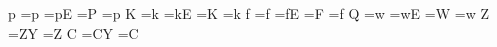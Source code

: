 {    \fi
   \fi%
  \else \if\thischar p%
   \iffollowingisboundary%
    \ifpreviousisboundary%
     \t@kenbuffer=\expandafter{\the\t@kenbuffer p}%
    \else     %
     \t@kenbuffer=\expandafter{\the\t@kenbuffer pE}%
    \fi%
   \else%
    \iffollowingforcesround%
     \t@kenbuffer=\expandafter{\the\t@kenbuffer P}%
    \else
     \t@kenbuffer=\expandafter{\the\t@kenbuffer p}%
    \fi
   \fi%
  \else \if\thischar K%
   \iffollowingisboundary%
    \ifpreviousisboundary%
     \t@kenbuffer=\expandafter{\the\t@kenbuffer k}%
    \else     %
     \t@kenbuffer=\expandafter{\the\t@kenbuffer kE}%
    \fi%
   \else%
    \iffollowingforcesround%
     \t@kenbuffer=\expandafter{\the\t@kenbuffer K}%
    \else
     \t@kenbuffer=\expandafter{\the\t@kenbuffer k}%
    \fi
   \fi%
  \else \if\thischar f%
   \iffollowingisboundary%
    \ifpreviousisboundary%
     \t@kenbuffer=\expandafter{\the\t@kenbuffer f}%
    \else     %
     \t@kenbuffer=\expandafter{\the\t@kenbuffer fE}%
    \fi%
   \else%
    \iffollowingforcesround%
     \t@kenbuffer=\expandafter{\the\t@kenbuffer F}%
    \else
     \t@kenbuffer=\expandafter{\the\t@kenbuffer f}%
    \fi
   \fi%
  \else \if\thischar Q%
   \iffollowingisboundary%
    \ifpreviousisboundary%
     \t@kenbuffer=\expandafter{\the\t@kenbuffer w}%
    \else     %
     \t@kenbuffer=\expandafter{\the\t@kenbuffer wE}%
    \fi%
   \else%
    \iffollowingforcesround%
     \t@kenbuffer=\expandafter{\the\t@kenbuffer W}%
    \else
     \t@kenbuffer=\expandafter{\the\t@kenbuffer w}%
    \fi
   \fi
  \else \if\thischar Z%
   \iffollowingisboundary
    \t@kenbuffer=\expandafter{\the\t@kenbuffer ZY}%
   \else
    \t@kenbuffer=\expandafter{\the\t@kenbuffer Z}%
   \fi
  \else \if\thischar C%
   \iffollowingisboundary
    \t@kenbuffer=\expandafter{\the\t@kenbuffer CY}%
   \else
    \t@kenbuffer=\expandafter{\the\t@kenbuffer C}%
   \fi
}

